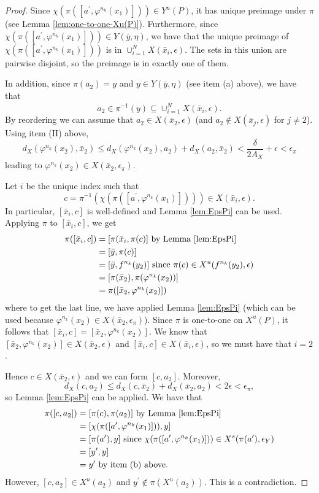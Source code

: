 \documentclass{amsart}
\theoremstyle{plain}
\theoremstyle{definition}
\theoremstyle{remark}
\begin{document}
\begin{proof}
Since $\chi(\pi( [a^{\prime}, \varphi^{n_k}(x_1)])) \in Y^u(P)$, it has unique preimage under $\pi$ (see Lemma \ref{lem:one-to-one-Xu(P)}). Furthermore, since $\chi(\pi( [a^{\prime}, \varphi^{n_k}(x_1)]))\in Y(\bar{y}, \eta)$, we have that the unique preimage of $ \chi(\pi( [a^{\prime}, \varphi^{n_k}(x_1)]))$ is in $\cup_{i=1}^{\bar{N}} X(\bar{x}_i, \epsilon)$. The sets in this union are pairwise disjoint, so the preimage is in exactly one of them. 

In addition, since $\pi(a_2)=y$ and $y \in Y(\bar{y}, \eta)$ (see item (a) above), we have that 
\[ a_2 \in \pi^{-1}(y) \subseteq \cup_{i=1}^{\bar{N}} X(\bar{x}_i, \epsilon).
\] 
By reordering we can assume that $a_2 \in X(\bar{x}_2, \epsilon)$ (and $a_2 \not\in X(\bar{x}_j, \epsilon)$ for $j\neq 2$). Using item (II) above, 
\[
d_X(\varphi^{n_k}(x_2), \bar{x}_2) \le d_X(\varphi^{n_k}(x_2), a_2) + d_X(a_2, \bar{x}_2) < \frac{\delta}{2A_X} + \epsilon < \epsilon_{\pi} 
\] 
leading to $\varphi^{n_k}(x_2)\in X(\bar{x}_2, \epsilon_{\pi})$. 

Let $i$ be the unique index such that 
\[ 
c=\pi^{-1}( \chi(\pi( [a^{\prime}, \varphi^{n_k}(x_1)]))) \in X(\bar{x}_i, \epsilon).
\] 
In particular, $[\bar{x}_i, c ]$ is well-defined and Lemma \ref{lem:EpsPi} can be used. Applying $\pi$ to $[\bar{x}_i, c]$, we get
\begin{align*}
\pi ( [ \bar{x}_i, c ]) & = [ \pi(\bar{x}_i, \pi(c)] \hbox{ by Lemma \ref{lem:EpsPi}} \\
& = [ \bar{y}, \pi(c) ] \\
& = [ \bar{y}, f^{n_k}(y_2) ] \hbox{ since }\pi(c) \in X^u(f^{n_k}(y_2), \epsilon) \\
& = [ \pi(\bar{x}_2), \pi(\varphi^{n_k}(x_2))] \\
& = \pi ([ \bar{x}_2, \varphi^{n_k}(x_2)])  
\end{align*}
where to get the last line, we have applied Lemma \ref{lem:EpsPi} (which can be used because $\varphi^{n_k}(x_2)\in X(\bar{x}_2, \epsilon_{\pi})$).
Since $\pi$ is one-to-one on $X^u(P)$, it follows that $[ \bar{x}_i, c ]=[ \bar{x}_2, \varphi^{n_k}(x_2) ]$. We know that $[ \bar{x}_2, \varphi^{n_k}(x_2) ] \in X(\bar{x}_2, \epsilon)$ and $[ \bar{x}_i, c ] \in X(\bar{x}_i, \epsilon)$, so we must have that $i=2$. 

Hence $c\in X(\bar{x}_2, \epsilon)$ and we can form $[ c, a_2]$. Moreover, 
\[ d_X(c, a_2)\le d_X(c, \bar{x}_2) + d_X(\bar{x}_2, a_2)< 2 \epsilon < \epsilon_{\pi},
\] 
so Lemma \ref{lem:EpsPi} can be applied. We have that
\begin{align*}
\pi([c, a_2]) & = [ \pi(c), \pi(a_2) ] \hbox{ by Lemma \ref{lem:EpsPi}} \\
& = [ \chi(\pi( [a^{\prime}, \varphi^{n_k}(x_1)])), y ] \\
& = [ \pi(a^{\prime}), y ] \hbox{ since }\chi(\pi( [a^{\prime}, \varphi^{n_k}(x_1)]))\in X^s(\pi(a^{\prime}), \epsilon_Y) \\
& = [ y^{\prime}, y] \\
& = y^{\prime} \hbox{ by item (b) above.}
\end{align*}
However, $[c, a_2] \in X^u(a_2)$ and $y^{\prime} \not\in \pi(X^u(a_2))$. This is a contradiction.


\end{proof}
\end{document}
